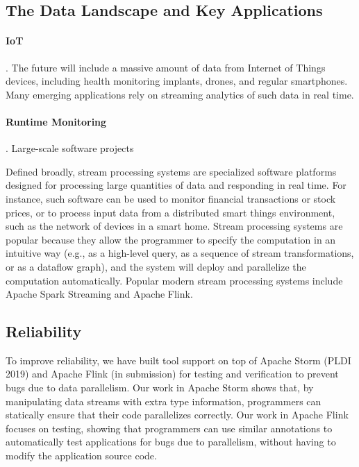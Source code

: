 \documentclass{article}
\begin{document}
\subsection*{The Data Landscape and Key Applications}

\paragraph*{IoT}.
The future will include a massive amount of data from Internet of Things devices, including health monitoring implants, drones, and regular smartphones. Many emerging applications rely on streaming analytics of such data in real time. 

\paragraph*{Runtime Monitoring}.
Large-scale software projects 


Defined broadly, stream processing systems are specialized software platforms designed for processing large quantities of data and responding in real time. For instance, such software can be used to monitor financial transactions or stock prices, or to process input data from a distributed smart things environment, such as the network of devices in a smart home. Stream processing systems are popular because they allow the programmer to specify the computation in an intuitive way (e.g., as a high-level query, as a sequence of stream transformations, or as a dataflow graph), and the system will deploy and parallelize the computation automatically. Popular modern stream processing systems include Apache Spark Streaming and Apache Flink.


\subsection*{Reliability}

To improve reliability, we have built tool support on top of Apache Storm (PLDI 2019) and Apache Flink (in submission) for testing and verification to prevent bugs due to data parallelism. Our work in Apache Storm shows that, by manipulating data streams with extra type information, programmers can statically ensure that their code parallelizes correctly. Our work in Apache Flink focuses on testing, showing that programmers can use similar annotations to automatically test applications for bugs due to parallelism, without having to modify the application source code.
\end{document}
